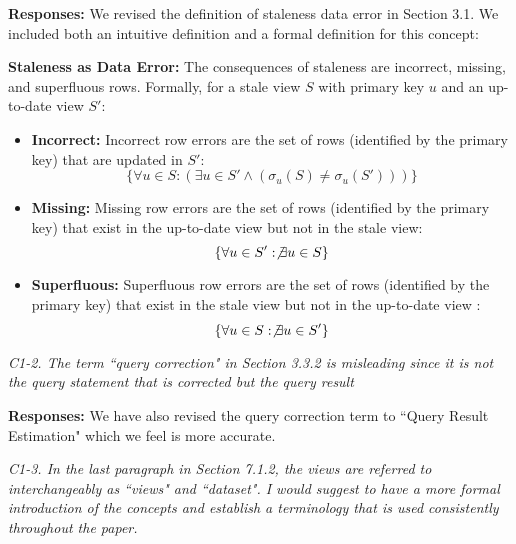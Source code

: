 {\bf Responses:} We revised the definition of staleness data error in Section 3.1. We included both an intuitive definition and a formal definition for this concept:
\begin{displayquote} 
\noindent \textbf{Staleness as Data Error: } The consequences of staleness are incorrect, missing, and superfluous rows. 
Formally, for a stale view $S$ with primary key $u$ and an up-to-date view $S'$:

\vspace{-.5em}

\begin{itemize}[noitemsep] \sloppy
	\item \textbf{Incorrect: } Incorrect row errors are the set of rows (identified by the primary key) that are updated in $S'$: \[\{\forall u \in S : (\exists u \in S' \wedge (\sigma_u(S) \ne \sigma_u(S')))\}\]
	\item \textbf{Missing: } Missing row errors are the set of rows (identified by the primary key) that exist in the up-to-date view but not in the stale view: \[\{\forall u \in S' : \not \exists u \in S\}\]
	\item \textbf{Superfluous: } Superfluous row errors are the set of rows (identified by the primary key) that exist in the stale view but not in the up-to-date view : \[\{ \forall u \in S : \not\exists u \in S' \}\]
\end{itemize}

\vspace{-.5em}

\end{displayquote} 

\vspace{1em}
\emph{C1-2. The term ``query correction" in Section 3.3.2 is misleading since it is not the query statement that is corrected but the query result}

\vspace{.25em}

{\bf Responses:} We have also revised the query correction term to ``Query Result Estimation" which we feel is more accurate.

\vspace{1em}
\emph{C1-3. In the last paragraph in Section 7.1.2, the views are referred to interchangeably as ``views" and ``dataset". I would suggest to have a more formal introduction of the concepts and establish a terminology that is used consistently throughout the paper.}

\vspace{.25em}

